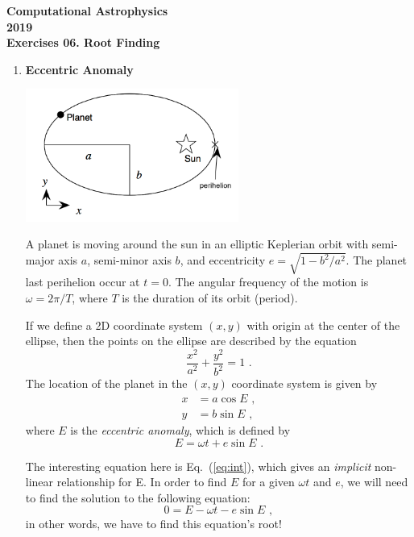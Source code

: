 \documentclass[11pt]{article}
\begin{document}
\begin{center}
\large \bf Computational Astrophysics \rm \\
2019\\
{\small Exercises 06. Root Finding}
\end{center}

\begin{enumerate}

\item {\bf Eccentric Anomaly}
\begin{center}
\includegraphics[width=0.55\textwidth]{orbit.png}
\vspace*{-0.5cm}
\end{center}

A planet is moving around the sun in an elliptic Keplerian orbit with
semi-major axis $a$, semi-minor axis $b$, and eccentricity $e =
\sqrt{1 - b^2/a^2}$.  The planet last perihelion occur at $t=0$.  The angular frequency of the motion is $\omega = 2\pi / T$, where $T$ is the duration of its orbit (period).

If we define a 2D coordinate system $(x,y)$ with origin at the center
of the ellipse, then the points on the ellipse are described by the
equation
\begin{equation}
\frac{x^2}{a^2} + \frac{y^2}{b^2} = 1\,\,.
\end{equation}
The location of the planet in the $(x,y)$ coordinate system is given
by 
\begin{equation}
\begin{aligned}
x &= a \cos E\,\,,\\
y &= b \sin E\,\,,
\end{aligned}
\end{equation}
where $E$ is the \emph{eccentric anomaly}, which is defined by
\begin{equation}
E = \omega t + e \sin E\,\,.
\label{eq:int}
\end{equation}


The interesting equation here is Eq.~(\ref{eq:int}), which gives an \emph{implicit}
non-linear relationship for E. In order to find $E$ for a given $\omega t$ and
$e$, we will need to find the solution to the following equation:
\begin{equation}
0 = E - \omega t - e \sin E\,\,,
\end{equation}
in other words, we have to find this equation's root!



\end{enumerate}
\end{document}
